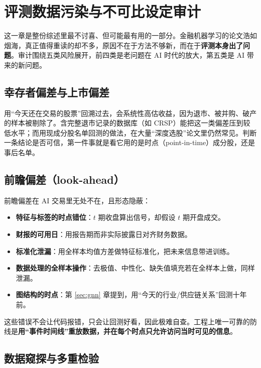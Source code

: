 \section{评测数据污染与不可比设定审计}\label{sec:audit}

这一章是整份综述里最不讨喜、但可能最有用的一部分。金融机器学习的论文浩如烟海，真正值得重读的却不多，原因不在于方法不够新，而在于\textbf{评测本身出了问题}。审计围绕五类风险展开，前四类是老问题在 AI 时代的放大，第五类是 AI 带来的新问题。

\subsection{幸存者偏差与上市偏差}

用“今天还在交易的股票”回溯过去，会系统性高估收益，因为退市、被并购、破产的样本被剔除了。含完整退市记录的数据库（如 CRSP）能把这一类偏差压到较低水平；而用现成分股名单回测的做法，在大量“深度选股”论文里仍然常见。判断一条结论是否可信，第一件事就是看它用的是时点（point-in-time）成分股，还是事后名单。

\subsection{前瞻偏差（look-ahead）}

前瞻偏差在 AI 交易里无处不在，且形态隐蔽：

\begin{itemize}
  \item \textbf{特征与标签的时点错位}：$t$ 期收盘算出信号，却假设 $t$ 期开盘成交。
  \item \textbf{财报的可用日}：用报告期而非实际披露日对齐财务数据。
  \item \textbf{标准化泄漏}：用全样本均值方差做特征标准化，把未来信息带进训练。
  \item \textbf{数据处理的全样本操作}：去极值、中性化、缺失值填充若在全样本上做，同样泄漏。
  \item \textbf{图结构的时点}：第 \ref{sec:gnn} 章提到，用“今天的行业/供应链关系”回测十年前。
\end{itemize}

这些错误不会让代码报错，只会让回测好看，因此极难自查。工程上唯一可靠的防线是\textbf{用“事件时间线”重放数据，并在每个时点只允许访问当时可见的信息}。

\subsection{数据窥探与多重检验}

